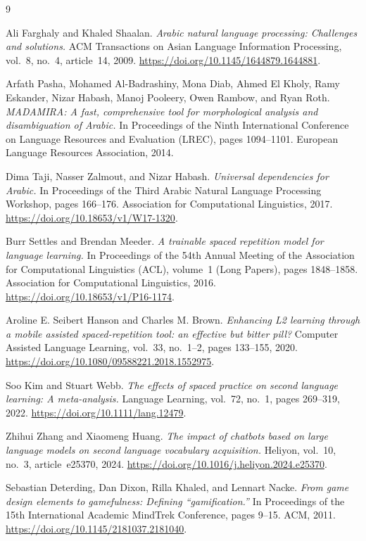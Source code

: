 \documentclass[A4paper,12pt]{article}
\begin{document}
\begin{thebibliography}{9}

Ali Farghaly and Khaled Shaalan.
\textit{Arabic natural language processing: Challenges and solutions.}
ACM Transactions on Asian Language Information Processing,
vol.~8, no.~4, article~14, 2009.
\url{https://doi.org/10.1145/1644879.1644881}.

Arfath Pasha, Mohamed Al-Badrashiny, Mona Diab, Ahmed El Kholy,
Ramy Eskander, Nizar Habash, Manoj Pooleery, Owen Rambow, and Ryan Roth.
\textit{{MADAMIRA}: A fast, comprehensive tool for morphological analysis
and disambiguation of Arabic.}
In Proceedings of the Ninth International Conference on Language Resources
and Evaluation (LREC), pages 1094--1101.
European Language Resources Association, 2014.

Dima Taji, Nasser Zalmout, and Nizar Habash.
\textit{Universal dependencies for Arabic.}
In Proceedings of the Third Arabic Natural Language Processing Workshop,
pages 166--176. Association for Computational Linguistics, 2017.
\url{https://doi.org/10.18653/v1/W17-1320}.

Burr Settles and Brendan Meeder.
\textit{A trainable spaced repetition model for language learning.}
In Proceedings of the 54th Annual Meeting of the Association for
Computational Linguistics (ACL), volume~1 (Long Papers),
pages 1848--1858. Association for Computational Linguistics, 2016.
\url{https://doi.org/10.18653/v1/P16-1174}.

Aroline E. Seibert Hanson and Charles M. Brown.
\textit{Enhancing {L2} learning through a mobile assisted spaced-repetition
tool: an effective but bitter pill?}
Computer Assisted Language Learning, vol.~33, no.~1--2,
pages 133--155, 2020.
\url{https://doi.org/10.1080/09588221.2018.1552975}.

Soo Kim and Stuart Webb.
\textit{The effects of spaced practice on second language learning:
A meta-analysis.}
Language Learning, vol.~72, no.~1, pages 269--319, 2022.
\url{https://doi.org/10.1111/lang.12479}.

Zhihui Zhang and Xiaomeng Huang.
\textit{The impact of chatbots based on large language models on second
language vocabulary acquisition.}
Heliyon, vol.~10, no.~3, article~e25370, 2024.
\url{https://doi.org/10.1016/j.heliyon.2024.e25370}.

Sebastian Deterding, Dan Dixon, Rilla Khaled, and Lennart Nacke.
\textit{From game design elements to gamefulness: Defining ``gamification.''}
In Proceedings of the 15th International Academic MindTrek Conference,
pages 9--15. ACM, 2011.
\url{https://doi.org/10.1145/2181037.2181040}.


\end{thebibliography}
\end{document}
